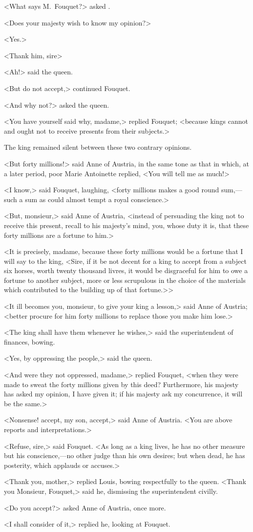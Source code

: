 <What says M.~Fouquet?> asked .

<Does your majesty wish to know my opinion?>

<Yes.>

<Thank him, sire\longdash>

<Ah!> said the queen.

<But do not accept,> continued Fouquet.

<And why not?> asked the queen.

<You have yourself said why, madame,> replied Fouquet; <because kings cannot and ought not to receive presents from their subjects.>

The king remained silent between these two contrary opinions.

<But forty millions!> said Anne of Austria, in the same tone as that in which, at a later period, poor Marie Antoinette replied, <You will tell me as much!>

<I know,> said Fouquet, laughing, <forty millions makes a good round sum,—such a sum as could almost tempt a royal conscience.>

<But, monsieur,> said Anne of Austria, <instead of persuading the king not to receive this present, recall to his majesty's mind, you, whose duty it is, that these forty millions are a fortune to him.>

<It is precisely, madame, because these forty millions would be a fortune that I will say to the king, <Sire, if it be not decent for a king to accept from a subject six horses, worth twenty thousand livres, it would be disgraceful for him to owe a fortune to another subject, more or less scrupulous in the choice of the materials which contributed to the building up of that fortune.>>

<It ill becomes you, monsieur, to give your king a lesson,> said Anne of Austria; <better procure for him forty millions to replace those you make him lose.>

<The king shall have them whenever he wishes,> said the superintendent of finances, bowing.

<Yes, by oppressing the people,> said the queen.

<And were they not oppressed, madame,> replied Fouquet, <when they were made to sweat the forty millions given by this deed? Furthermore, his majesty has asked my opinion, I have given it; if his majesty ask my concurrence, it will be the same.>

<Nonsense! accept, my son, accept,> said Anne of Austria. <You are above reports and interpretations.>

<Refuse, sire,> said Fouquet. <As long as a king lives, he has no other measure but his conscience,—no other judge than his own desires; but when dead, he has posterity, which applauds or accuses.>

<Thank you, mother,> replied Louis, bowing respectfully to the queen. <Thank you Monsieur, Fouquet,> said he, dismissing the superintendent civilly.

<Do you accept?> asked Anne of Austria, once more.

<I shall consider of it,> replied he, looking at Fouquet. 